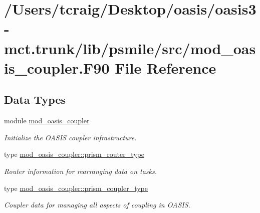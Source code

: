 \hypertarget{mod__oasis__coupler_8_f90}{\section{/\+Users/tcraig/\+Desktop/oasis/oasis3-\/mct.trunk/lib/psmile/src/mod\+\_\+oasis\+\_\+coupler.F90 File Reference}
\label{mod__oasis__coupler_8_f90}
}
\subsection*{Data Types}
\begin{DoxyCompactItemize}
\item 
module \hyperlink{classmod__oasis__coupler}{mod\+\_\+oasis\+\_\+coupler}
\begin{DoxyCompactList}\small\item\em Initialize the O\+A\+S\+I\+S coupler infrastructure. \end{DoxyCompactList}\item 
type \hyperlink{structmod__oasis__coupler_1_1prism__router__type}{mod\+\_\+oasis\+\_\+coupler\+::prism\+\_\+router\+\_\+type}
\begin{DoxyCompactList}\small\item\em Router information for rearranging data on tasks. \end{DoxyCompactList}\item 
type \hyperlink{structmod__oasis__coupler_1_1prism__coupler__type}{mod\+\_\+oasis\+\_\+coupler\+::prism\+\_\+coupler\+\_\+type}
\begin{DoxyCompactList}\small\item\em Coupler data for managing all aspects of coupling in O\+A\+S\+I\+S. \end{DoxyCompactList}\end{DoxyCompactItemize}
